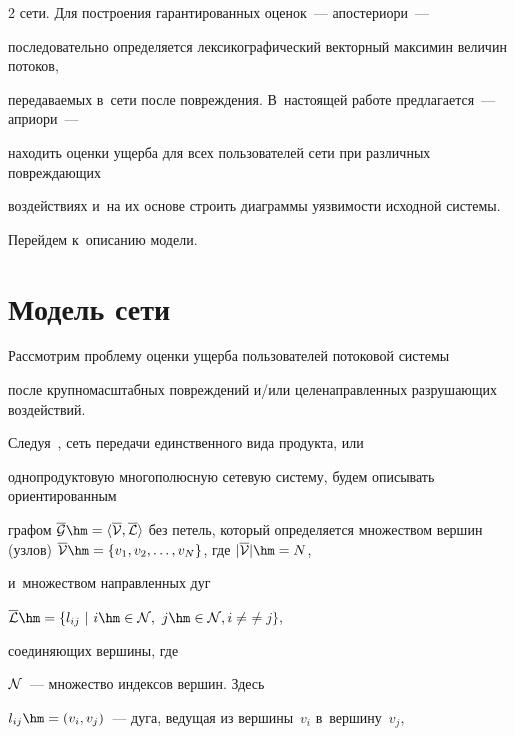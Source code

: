 \begin{multicols}{2}
сети. Для по\-стро\-ения  гарантированных оценок~---  апостериори~---   


последовательно  определяется лексикографический векторный  максимин величин потоков, 


пе\-ре\-да\-ва\-емых в~сети после повреждения.   В~настоящей работе предлагается~--- априори~--- 


находить оценки  ущерба для всех пользователей сети при различных  по\-вреж\-да\-ющих 


воздействиях и~на их основе строить диаграммы уязвимости исходной системы. 


Перейдем к~описанию модели. 





\vspace*{-9pt}





\section{Модель сети}





Рассмотрим проблему оценки ущерба пользователей потоковой системы 


после крупномасштабных повреждений и/или целенаправленных разрушающих воздействий.


Следуя~\cite{ford}, сеть передачи единственного вида продукта, или 


однопродуктовую многополюсную сетевую систему, будем описывать ориентированным 


графом $\overline {\mathcal{G}} \hm= \langle \overline{\cal V}, \overline {\cal L} 


\rangle$ без петель, который определяется множеством вершин (узлов) $\overline{\cal V} 


\hm= \{v_1,v_2,\ldots,v_ N\}$, где $|\overline{\cal V}| \hm=  N$, 


и~множеством направленных дуг


$\overline {\cal L} \hm=\{l_{ij} \ | \ i \hm\in {\cal N}, \ j \hm\in {\cal N},


 i \not=$\linebreak $\not= j \}$,


соединяющих вершины, где


${\cal N}$~--- множество индексов вершин. Здесь


$l_{ij} \hm= (v_i, v_j)$~---  дуга, ведущая из вершины~$v_i$ в~вершину~$v_j$, 



\end{multicols}
